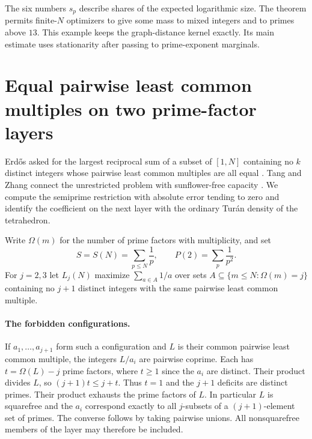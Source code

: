 \documentclass[11pt,a4paper]{article}
\begin{document}
The six numbers $s_p$ describe shares of the expected logarithmic size. The theorem permits finite-$N$ optimizers to give some mass to mixed integers and to primes above $13$. This example keeps the graph-distance kernel exactly. Its main estimate uses stationarity after passing to prime-exponent marginals.

\section{Equal pairwise least common multiples on two prime-factor layers}
\label{sec:lcm-transfer}
Erd\H{o}s asked for the largest reciprocal sum of a subset of $[1,N]$ containing
no $k$ distinct integers whose pairwise least common multiples are all equal
\cite{erdos-lcm}. Tang and Zhang connect the unrestricted problem with
sunflower-free capacity \cite{tangzhang-lcm}. We compute the semiprime
restriction with absolute error tending to zero and identify the coefficient
on the next layer with the ordinary Tur\'an density of the tetrahedron.

Write $\Omega(m)$ for the number of prime factors with multiplicity, and set
\[
 S=S(N)=\sum_{p\le N}\frac1p,\qquad P(2)=\sum_p\frac1{p^2}.
\]
For $j=2,3$ let $L_j(N)$ maximize $\sum_{a\in A}1/a$ over sets
$A\subseteq\{m\le N:\Omega(m)=j\}$ containing no $j+1$ distinct
integers with the same pairwise least common multiple.

\paragraph{The forbidden configurations.}
If $a_1,\ldots,a_{j+1}$ form such a configuration and $L$ is their
common pairwise least common multiple, the integers $L/a_i$ are pairwise
coprime. Each has $t=\Omega(L)-j$ prime factors, where $t\ge1$ since
the $a_i$ are distinct. Their product divides $L$, so
$(j+1)t\le j+t$. Thus $t=1$ and the $j+1$ deficits are distinct primes.
Their product exhausts the prime factors of $L$. In particular $L$ is
squarefree and the $a_i$ correspond exactly to all $j$-subsets of a
$(j+1)$-element set of primes. The converse follows by taking pairwise
unions. All nonsquarefree members of the layer may therefore be included.
\end{document}
